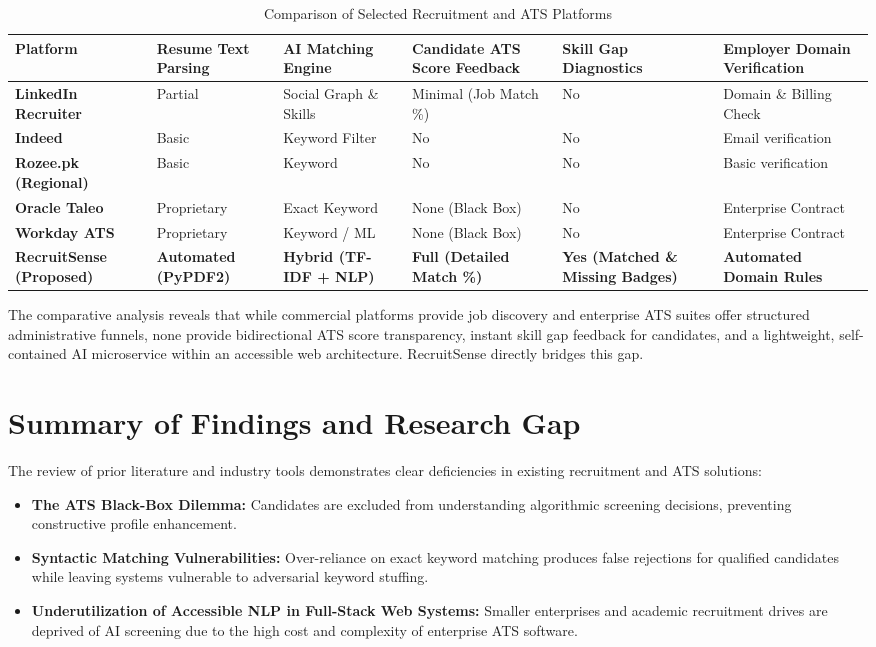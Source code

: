 \begin{table}[h!]
\centering
\small
\caption{Comparison of Selected Recruitment and ATS Platforms}
\label{tab:comparison_marketplaces}
\begin{tabular}{|p{3.2cm}|p{1.8cm}|p{2.2cm}|p{2.2cm}|p{2cm}|p{2.5cm}|}
\hline
\textbf{Platform} & \textbf{Resume Text Parsing} & \textbf{AI Matching Engine} & \textbf{Candidate ATS Score Feedback} & \textbf{Skill Gap Diagnostics} & \textbf{Employer Domain Verification} \\ \hline
\textbf{LinkedIn Recruiter} & Partial & Social Graph \& Skills & Minimal (Job Match \%) & No & Domain \& Billing Check \\ \hline
\textbf{Indeed} & Basic & Keyword Filter & No & No & Email verification \\ \hline
\textbf{Rozee.pk (Regional)} & Basic & Keyword & No & No & Basic verification \\ \hline
\textbf{Oracle Taleo} & Proprietary & Exact Keyword & None (Black Box) & No & Enterprise Contract \\ \hline
\textbf{Workday ATS} & Proprietary & Keyword / ML & None (Black Box) & No & Enterprise Contract \\ \hline
\textbf{RecruitSense (Proposed)} & \textbf{Automated (PyPDF2)} & \textbf{Hybrid (TF-IDF + NLP)} & \textbf{Full (Detailed Match \%)} & \textbf{Yes (Matched \& Missing Badges)} & \textbf{Automated Domain Rules} \\ \hline
\end{tabular}
\end{table}

The comparative analysis reveals that while commercial platforms provide job discovery and enterprise ATS suites offer structured administrative funnels, none provide bidirectional ATS score transparency, instant skill gap feedback for candidates, and a lightweight, self-contained AI microservice within an accessible web architecture. RecruitSense directly bridges this gap.

\section{Summary of Findings and Research Gap}
The review of prior literature and industry tools demonstrates clear deficiencies in existing recruitment and ATS solutions:
\begin{itemize}
    \item \textbf{The ATS Black-Box Dilemma:} Candidates are excluded from understanding algorithmic screening decisions, preventing constructive profile enhancement.
    \item \textbf{Syntactic Matching Vulnerabilities:} Over-reliance on exact keyword matching produces false rejections for qualified candidates while leaving systems vulnerable to adversarial keyword stuffing.
    \item \textbf{Underutilization of Accessible NLP in Full-Stack Web Systems:} Smaller enterprises and academic recruitment drives are deprived of AI screening due to the high cost and complexity of enterprise ATS software.
\end{itemize}

